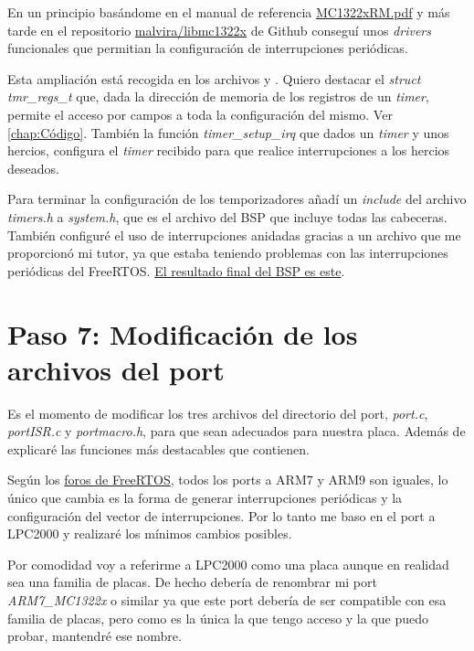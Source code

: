 En un principio basándome en el manual de referencia \href{https://www.nxp.com/docs/en/reference-manual/MC1322xRM.pdf}{MC1322xRM.pdf} y más tarde en el repositorio \href{https://github.com/malvira/libmc1322x}{malvira/libmc1322x} de Github conseguí unos \emph{drivers} funcionales que permitian la configuración de interrupciones periódicas.

Esta ampliación está recogida en los archivos  y . Quiero destacar el \emph{struct tmr\_regs\_t} que, dada la dirección de memoria de los registros de un \emph{timer}, permite el acceso por campos a toda la configuración del mismo. Ver \autoref{chap:Código}. También la función \emph{timer\_setup\_irq} que dados un \emph{timer} y unos hercios, configura el \emph{timer} recibido para que realice interrupciones a los hercios deseados.

Para terminar la configuración de los temporizadores añadí un \emph{include} del archivo \emph{timers.h} a \emph{system.h}, que es el archivo del BSP que incluye todas las cabeceras.\\

También configuré el uso de interrupciones anidadas gracias a un archivo que me proporcionó mi tutor, ya que estaba teniendo problemas con las interrupciones periódicas del FreeRTOS.
\href{https://github.com/epaubert/FreeRTOS-kérnel-TFG/tree/main/portable/GCC/ARM7_MC13224V/bsp}{El resultado final del BSP es este}.

\section{Paso 7: Modificación de los archivos del port}
Es el momento de modificar los tres archivos del directorio del port, \emph{port.c}, \emph{portISR.c} y \emph{portmacro.h}, para que sean adecuados para nuestra placa. Además de explicaré las funciones más destacables que contienen.

Según los \href{https://forums.freertos.org/t/new-port-attempted-is-hanging-rowley-xstudio/3337/2}{foros de FreeRTOS}, todos los ports a ARM7 y ARM9 son iguales, lo único que cambia es la forma de generar interrupciones periódicas y la configuración del vector de interrupciones. Por lo tanto me baso en el port a LPC2000 y realizaré los mínimos cambios posibles.

Por comodidad voy a referirme a LPC2000 como una placa aunque en realidad sea una familia de placas. De hecho debería de renombrar mi port \emph{ARM7\_MC1322x} o similar ya que este port debería de ser compatible con esa familia de placas, pero como es la única la que tengo acceso y la que puedo probar, mantendré ese nombre.\\

